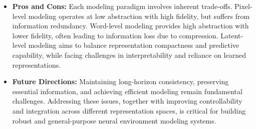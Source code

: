 \documentclass{llmxive}
\providecommand{\arraystretch}{1.3}
\begin{document}
\begin{tcolorbox}[takeaway,title={Takeaway 5.2}]
\begin{itemize}
\item \textbf{Pros and Cons:} Each modeling paradigm involves inherent trade-offs.
Pixel-level modeling operates at low abstraction with high fidelity, but suffers from information redundancy. 
Word-level modeling provides high abstraction with lower fidelity, often leading to information loss due to compression. 
Latent-level modeling aims to balance representation compactness and predictive capability, while facing challenges in interpretability and reliance on learned representations.

\item \textbf{Future Directions:} Maintaining long-horizon consistency, preserving essential information, and achieving efficient modeling remain fundamental challenges. Addressing these issues, together with improving controllability and integration across different representation spaces, is critical for building robust and general-purpose neural environment modeling systems.
\end{itemize}
\end{tcolorbox}
\renewcommand{\arraystretch}{1.5} 
\end{document}
